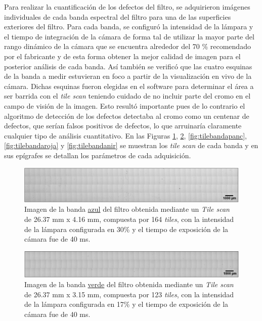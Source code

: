 \hspace{0.5cm}Para realizar la cuantificación de los defectos del filtro, se adquirieron imágenes individuales de cada banda espectral del filtro para una de las superficies exteriores del filtro. Para cada banda, se configuró la intensidad de la lámpara y el tiempo de integración de la cámara de forma tal de utilizar la mayor parte del rango dinámico de la cámara que se encuentra alrededor del 70 \% recomendado por el fabricante y de esta forma obtener la mejor calidad de imagen para el posterior análisis de cada banda. Así también se verificó que las cuatro esquinas de la banda a medir estuvieran en foco a partir de la visualización en vivo de la cámara. Dichas esquinas fueron elegidas en el software para determinar el área a ser barrida con el \textit{tile scan} teniendo cuidado de no incluir parte del cromo en el campo de visión de la imagen. Esto resultó importante pues de lo contrario el algoritmo de detección de los defectos detectaba al cromo como un centenar de defectos, que serían falsos positivos de defectos, lo que arruinaría claramente cualquier tipo de análisis cuantitativo. En las Figuras \ref{fig:tilebandaazul}, \ref{fig:tilebandaverde}, \ref{fig:tilebandapanc}, \ref{fig:tilebandaroja} y \ref{fig:tilebandanir} se muestran los \textit{tile scan} de cada banda y en sus epígrafes se detallan los parámetros de cada adquisición.
\begin{figure}[H]
	\centering
	\includegraphics[width=1.0\textwidth]{Figs/cuantificaciondefectos/banda_AZUL.png}
	\caption{Imagen de la banda \underline{azul} del filtro obtenida mediante un \textit{Tile scan} de 26.37 mm x 4.16 mm, compuesta por 164 \textit{tiles}, con la intensidad de la lámpara configurada en 30\% y el tiempo de exposición de la cámara fue de 40 ms.}
	\label{fig:tilebandaazul}
\end{figure}
\begin{figure}[H]
	\centering
	\includegraphics[width=1.0\textwidth]{Figs/cuantificaciondefectos/banda_VERDE.png}
	\caption{Imagen de la banda \underline{verde} del filtro obtenida mediante un \textit{Tile scan} de 26.37 mm x 3.15 mm, compuesta por 123 \textit{tiles}, con la intensidad de la lámpara configurada en 17\% y el tiempo de exposición de la cámara fue de 40 ms.}
	\label{fig:tilebandaverde}
\end{figure}

